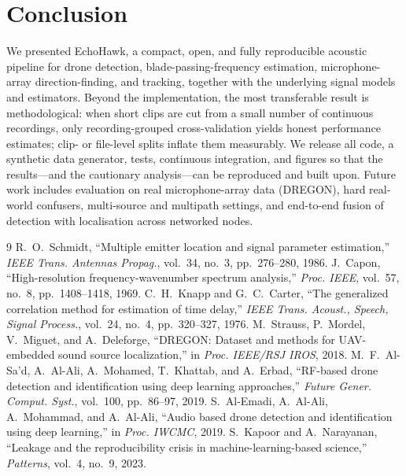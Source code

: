 \documentclass[11pt]{article}
\begin{document}
\section{Conclusion}
\label{sec:conc}
We presented EchoHawk, a compact, open, and fully reproducible acoustic pipeline
for drone detection, blade-passing-frequency estimation, microphone-array
direction-finding, and tracking, together with the underlying signal models and
estimators. Beyond the implementation, the most transferable result is
methodological: when short clips are cut from a small number of continuous
recordings, only recording-grouped cross-validation yields honest performance
estimates; clip- or file-level splits inflate them measurably. We release all
code, a synthetic data generator, tests, continuous integration, and figures so
that the results---and the cautionary analysis---can be reproduced and built upon.
Future work includes evaluation on real microphone-array data (DREGON), hard
real-world confusers, multi-source and multipath settings, and end-to-end fusion
of detection with localisation across networked nodes.

\begin{thebibliography}{9}
 R.~O.~Schmidt, ``Multiple emitter location and signal parameter
estimation,'' \emph{IEEE Trans. Antennas Propag.}, vol.~34, no.~3, pp.~276--280, 1986.
 J.~Capon, ``High-resolution frequency-wavenumber spectrum
analysis,'' \emph{Proc. IEEE}, vol.~57, no.~8, pp.~1408--1418, 1969.
 C.~H.~Knapp and G.~C.~Carter, ``The generalized correlation
method for estimation of time delay,'' \emph{IEEE Trans. Acoust., Speech, Signal
Process.}, vol.~24, no.~4, pp.~320--327, 1976.
 M.~Strauss, P.~Mordel, V.~Miguet, and A.~Deleforge, ``DREGON:
Dataset and methods for UAV-embedded sound source localization,'' in
\emph{Proc. IEEE/RSJ IROS}, 2018.
 M.~F.~Al-Sa'd, A.~Al-Ali, A.~Mohamed, T.~Khattab, and
A.~Erbad, ``RF-based drone detection and identification using deep learning
approaches,'' \emph{Future Gener. Comput. Syst.}, vol.~100, pp.~86--97, 2019.
 S.~Al-Emadi, A.~Al-Ali, A.~Mohammad, and A.~Al-Ali, ``Audio
based drone detection and identification using deep learning,'' in \emph{Proc.
IWCMC}, 2019.
 S.~Kapoor and A.~Narayanan, ``Leakage and the reproducibility
crisis in machine-learning-based science,'' \emph{Patterns}, vol.~4, no.~9, 2023.
\end{thebibliography}
\end{document}
